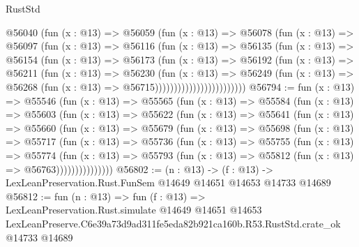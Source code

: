 \begin{lexlean}{RustStd}
\begin{coremodule}
                        @56040
                          (fun (x : @13) =>
                          @56059
                            (fun (x : @13) =>
                            @56078
                              (fun (x : @13) =>
                              @56097
                                (fun (x : @13) =>
                                @56116
                                  (fun (x : @13) =>
                                  @56135
                                    (fun (x : @13) =>
                                    @56154
                                      (fun (x : @13) =>
                                      @56173
                                        (fun (x : @13) =>
                                        @56192
                                          (fun (x : @13) =>
                                          @56211
                                            (fun (x : @13) =>
                                            @56230
                                              (fun (x : @13) =>
                                              @56249
                                                (fun (x : @13) =>
                                                @56268
                                                  (fun (x : @13) => @56715))))))))))))))))))))))))
@56794 := fun (x : @13) =>
  @55546
    (fun (x : @13) =>
    @55565
      (fun (x : @13) =>
      @55584
        (fun (x : @13) =>
        @55603
          (fun (x : @13) =>
          @55622
            (fun (x : @13) =>
            @55641
              (fun (x : @13) =>
              @55660
                (fun (x : @13) =>
                @55679
                  (fun (x : @13) =>
                  @55698
                    (fun (x : @13) =>
                    @55717
                      (fun (x : @13) =>
                      @55736
                        (fun (x : @13) =>
                        @55755
                          (fun (x : @13) =>
                          @55774
                            (fun (x : @13) =>
                            @55793 (fun (x : @13) => @55812 (fun (x : @13) => @56763)))))))))))))))
@56802 := (n : @13) ->
  (f : @13) -> LexLeanPreservation.Rust.FunSem @14649 @14651 @14653 @14733 @14689
@56812 := fun (n : @13) =>
  fun (f : @13) =>
  LexLeanPreservation.Rust.simulate
    @14649
    @14651
    @14653
    LexLeanPreserve.C6e39a73d9ad311fe5eda82b921ca160b.R53.RustStd.crate_ok
    @14733
    @14689
\end{coremodule}
\end{lexlean}
